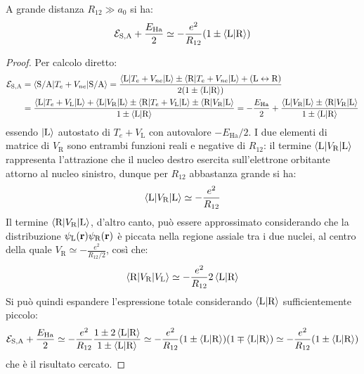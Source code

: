 \begin{proposition}{}{}
	A grande distanza $ R_{12} \gg a_0 $ si ha:
	\begin{equation}
		\mathcal{E}_{\text{S},\text{A}} + \frac{E_\text{Ha}}{2} \simeq - \frac{e^2}{R_{12}} (1 \pm \braket{\text{L} | \text{R}})
		\label{eq:h2-symm-asymm}
	\end{equation}

	\tcblower

	\begin{proof}
		Per calcolo diretto:
		\begin{equation*}
			\begin{split}
				\mathcal{E}_\text{\text{S},\text{A}}
				& = \braket{\text{S}/\text{A} | T_e + V_{ne} | \text{S}/\text{A}} = \frac{\braket{\text{L} | T_e + V_{ne} | \text{L}} \pm \braket{\text{R} | T_e + V_{ne} | \text{L}} + (\text{L} \leftrightarrow \text{R})}{2 (1 \pm \braket{\text{L} | \text{R}})} \\
				& = \frac{\braket{\text{L} | T_e + V_\text{L} | \text{L}} + \braket{\text{L} | V_\text{R} | \text{L}} \pm \braket{\text{R} | T_e + V_\text{L} | \text{L}} \pm \braket{\text{R} | V_\text{R} | \text{L}}}{1 \pm \braket{\text{L} | \text{R}}} = - \frac{E_\text{Ha}}{2} + \frac{\braket{\text{L} | V_\text{R} | \text{L}} \pm \braket{\text{R} | V_\text{R} | \text{L}}}{1 \pm \braket{\text{L} | \text{R}}}
			\end{split}
		\end{equation*}
		essendo $ \ket{\text{L}} $ autostato di $ T_e + V_\text{L} $ con autovalore $ -E_\text{Ha}/2 $. I due elementi di matrice di $ V_\text{R} $ sono entrambi funzioni reali e negative di $ R_{12} $: il termine $ \braket{\text{L} | V_\text{R} | \text{L}} $ rappresenta l'attrazione che il nucleo destro esercita sull'elettrone orbitante attorno al nucleo sinistro, dunque per $ R_{12} $ abbastanza grande si ha:
		\begin{equation*}
			\braket{\text{L} | V_\text{R} | \text{L}} \simeq - \frac{e^2}{R_{12}}
		\end{equation*}
		Il termine $ \braket{\text{R} | V_\text{R} | \text{L}} $, d'altro canto, può essere approssimato considerando che la distribuzione $ \psi_\text{L}(\mathbf{r}) \psi_\text{R}(\mathbf{r}) $ è piccata nella regione assiale tra i due nuclei, al centro della quale $ V_\text{R} \simeq - \frac{e^2}{R_{12}/2} $, così che:
		\begin{equation*}
			\braket{\text{R} | V_\text{R} | V_\text{L}} \simeq - \frac{e^2}{R_{12}} 2\braket{\text{L} | \text{R}}
		\end{equation*}
		Si può quindi espandere l'espressione totale considerando $ \braket{\text{L} | \text{R}} $ sufficientemente piccolo:
		\begin{equation*}
			\mathcal{E}_{\text{S},\text{A}} + \frac{E_\text{Ha}}{2} \simeq - \frac{e^2}{R_{12}} \frac{1 \pm 2 \braket{\text{L} | \text{R}}}{1 \pm \braket{\text{L} | \text{R}}} \simeq - \frac{e^2}{R_{12}} (1 \pm \braket{\text{L} | \text{R}})(1 \mp \braket{\text{L} | \text{R}}) \simeq - \frac{e^2}{R_{12}} (1 \pm \braket{\text{L} | \text{R}})
		\end{equation*}
		che è il risultato cercato.
	\end{proof}
\end{proposition}


